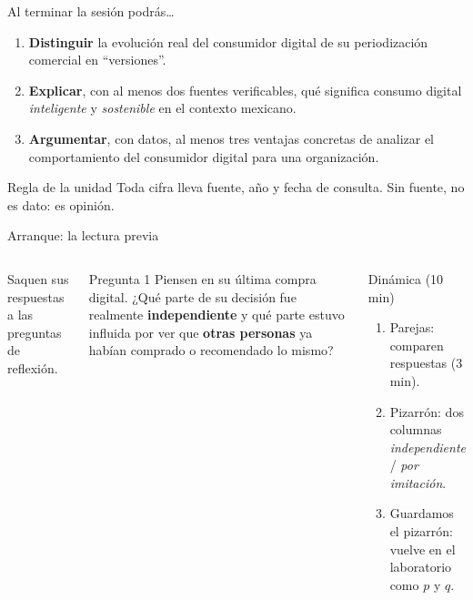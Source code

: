 \documentclass[aspectratio=169,xcolor=dvipsnames]{beamer}
\begin{document}
\begin{frame}{Al terminar la sesión podrás\ldots}
\begin{enumerate}
  \item \textbf{Distinguir} la evolución real del consumidor digital de su periodización comercial en \enquote{versiones}.
  \vspace{6pt}
  \item \textbf{Explicar}, con al menos dos fuentes verificables, qué significa consumo digital \emph{inteligente} y \emph{sostenible} en el contexto mexicano.
  \vspace{6pt}
  \item \textbf{Argumentar}, con datos, al menos tres ventajas concretas de analizar el comportamiento del consumidor digital para una organización.
\end{enumerate}
\vspace{8pt}
\begin{alertblock}{Regla de la unidad}
  Toda cifra lleva fuente, año y fecha de consulta. Sin fuente, no es dato: es opinión.
\end{alertblock}
\end{frame}

\begin{frame}{Arranque: la lectura previa}
\begin{columns}[T]
  Saquen sus respuestas a las preguntas de reflexión.
  \vspace{6pt}
  \begin{exampleblock}{Pregunta 1}
    Piensen en su última compra digital. ¿Qué parte de su decisión fue realmente \textbf{independiente} y qué parte estuvo influida por ver que \textbf{otras personas} ya habían comprado o recomendado lo mismo?
  \end{exampleblock}
  \begin{block}{Dinámica (10 min)}
    \small
    \begin{enumerate}
      \item Parejas: comparen respuestas (3 min).
      \item Pizarrón: dos columnas \emph{independiente} / \emph{por imitación}.
      \item Guardamos el pizarrón: vuelve en el laboratorio como $p$ y $q$.
    \end{enumerate}
  \end{block}
\end{columns}
\end{frame}
\end{document}
